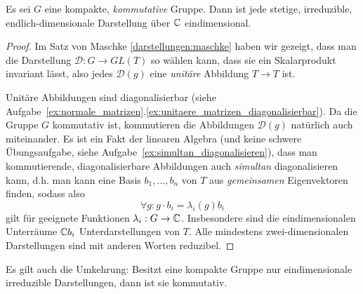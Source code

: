 \begin{theorem}
Es sei $G$ eine kompakte, \emph{kommutative} Gruppe. Dann ist jede stetige, irreduzible, endlich-dimensionale Darstellung über $\mathbb{C}$ eindimensional.
\end{theorem}
\begin{proof}
Im Satz von Maschke \ref{darstellungen:maschke} haben wir gezeigt, dass man die Darstellung $\mathcal{D} : G \to GL(T)$ so wählen kann, dass sie ein Skalarprodukt invariant lässt, also jedes $\mathcal{D}(g)$ eine \emph{unitäre} Abbildung $T\to T$ ist.

Unitäre Abbildungen sind diagonalisierbar (siehe Aufgabe~\ref{ex:normale_matrizen}.\ref{ex:unitaere_matrizen_diagonalisierbar}). Da die Gruppe $G$ kommutativ ist, kommutieren die Abbildungen $\mathcal{D}(g)$ natürlich auch miteinander. Es ist ein Fakt der linearen Algebra (und keine schwere Übungsaufgabe, siehe Aufgabe~\ref{ex:simultan_diagonalisieren}), dass man kommutierende, diagonalisierbare Abbildungen auch \emph{simultan} diagonalisieren kann, d.h. man kann eine Basis $b_1, \ldots, b_n$ von $T$ aus \emph{gemeinsamen} Eigenvektoren finden, sodass also
\[\forall g: g\cdot b_i = \lambda_i(g) b_i\]
gilt für geeignete Funktionen $\lambda_i: G\to\mathbb{C}$. Insbesondere sind die eindimensionalen Unterräume $\mathbb{C} b_i$ Unterdarstellungen von $T$. Alle mindestens zwei-dimensionalen Darstellungen sind mit anderen Worten reduzibel.
\end{proof}

\begin{remark}
Es gilt auch die Umkehrung: Besitzt eine kompakte Gruppe nur eindimensionale irreduzible Darstellungen, dann ist sie kommutativ.
\end{remark}

